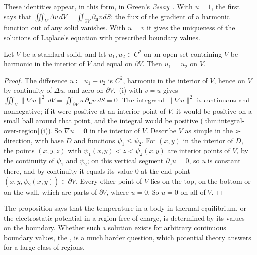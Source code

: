 These identities appear, in this form, in Green's \emph{Essay}~\cite{green1828}. With $u=1$, the first says that $\iiint_V\Delta v\,dV=\iint_{\partial V}\partial_{\mathbf n}v\,dS$: the flux of the gradient of a harmonic function out of any solid vanishes. With $u=v$ it gives the uniqueness of the solutions of Laplace's equation with prescribed boundary values.

\begin{proposition}
\label{prop:dirichlet-unique}
Let $V$ be a standard solid, and let $u_1,u_2\in C^2$ on an open set containing $V$ be harmonic in the interior of $V$ and equal on $\partial V$. Then $u_1=u_2$ on $V$.
\end{proposition}

\begin{proof}
The difference $u\coloneqq u_1-u_2$ is $C^2$, harmonic in the interior of $V$, hence on $V$ by continuity of $\Delta u$, and zero on $\partial V$. \,(i) with $v=u$ gives $\iiint_V\|\nabla u\|^2\,dV=\iint_{\partial V}u\,\partial_{\mathbf n}u\,dS=0$. The integrand $\|\nabla u\|^2$ is continuous and nonnegative; if it were positive at an interior point of $V$, it would be positive on a small ball around that point, and the integral would be positive (\cref{thm:integral-over-region}\,(i)). So $\nabla u=\mathbf0$ in the interior of $V$. Describe $V$ as simple in the $z$-direction, with base $D$ and functions $\psi_1\le\psi_2$. For $(x,y)$ in the interior of $D$, the points $(x,y,z)$ with $\psi_1(x,y)<z<\psi_2(x,y)$ are interior points of $V$, by the continuity of $\psi_1$ and $\psi_2$; on this vertical segment $\partial_zu=0$, so $u$ is constant there, and by continuity it equals its value $0$ at the end point $(x,y,\psi_2(x,y))\in\partial V$. Every other point of $V$ lies on the top, on the bottom or on the wall, which are parts of $\partial V$, where $u=0$. So $u=0$ on all of $V$.
\end{proof}

The proposition says that the temperature in a body in thermal equilibrium, or the electrostatic potential in a region free of charge, is determined by its values on the boundary. Whether such a solution exists for arbitrary continuous boundary values, the , is a much harder question, which potential theory answers for a large class of regions.

